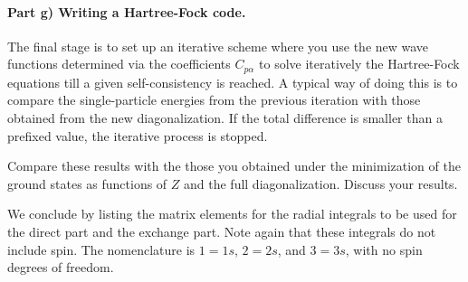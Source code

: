 \documentclass[%
oneside,                 %
final,                   %
10pt]{article}
\begin{document}
\paragraph{Part g) Writing a Hartree-Fock code.}
The final stage is to set up an iterative scheme where you use the new
wave functions determined via the coefficients $C_{p\alpha}$ to solve
iteratively the Hartree-Fock equations till a given self-consistency
is reached. A typical way of doing this is to compare the
single-particle energies from the previous iteration with those
obtained from the new diagonalization. If the total difference is
smaller than a prefixed value, the iterative process is stopped.

Compare these results with the those you obtained under the
minimization of the ground states as functions of $Z$ and the full
diagonalization. Discuss your results.

We conclude by listing the matrix elements for the radial integrals to
be used for the direct part and the exchange part. Note again that
these integrals do not include spin. The nomenclature is $1=1s$,
$2=2s$, and $3=3s$, with no spin degrees of freedom.
\end{document}
